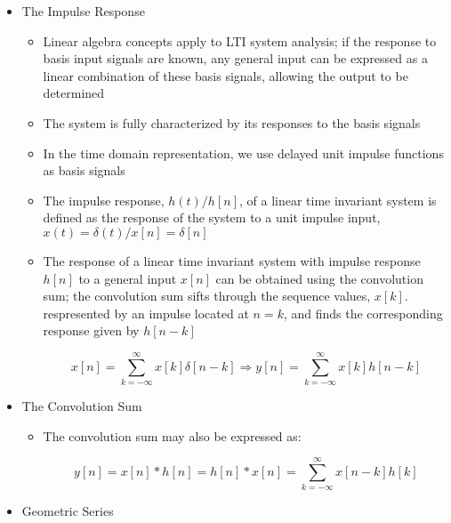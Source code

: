 \begin{itemize}

  \item The Impulse Response

    \begin{itemize}

      \item Linear algebra concepts apply to LTI system analysis; if the response to basis input signals are known, any general input can be expressed as a linear combination of these basis signals, allowing the output to be determined

      \item The system is fully characterized by its responses to the basis signals

      \item In the time domain representation, we use delayed unit impulse functions as basis signals

      \item The impulse response, $h(t)/h[n]$, of a linear time invariant system is defined as the response of the system to a unit impulse input, $x(t)=\delta(t)/x[n]=\delta[n]$

      \item The response of a linear time invariant system with impulse response $h[n]$ to a general input $x[n]$ can be obtained using the convolution sum; the convolution sum sifts through the sequence values, $x[k]$. respresented by an impulse located at $n=k$, and finds the corresponding response given by $h[n-k]$

        $$x[n]=\sum_{k=-\infty}^{\infty}x[k]\delta[n-k]\Longrightarrow y[n]=\sum_{k=-\infty}^{\infty}x[k]h[n-k]$$

    \end{itemize}

  \item The Convolution Sum

    \begin{itemize}

      \item The convolution sum may also be expressed as:

        $$y[n]=x[n]*h[n]=h[n]*x[n]=\sum_{k=-\infty}^{\infty}x[n-k]h[k]$$

    \end{itemize}

  \item Geometric Series

    \begin{itemize}


\end{itemize}
\end{itemize}
